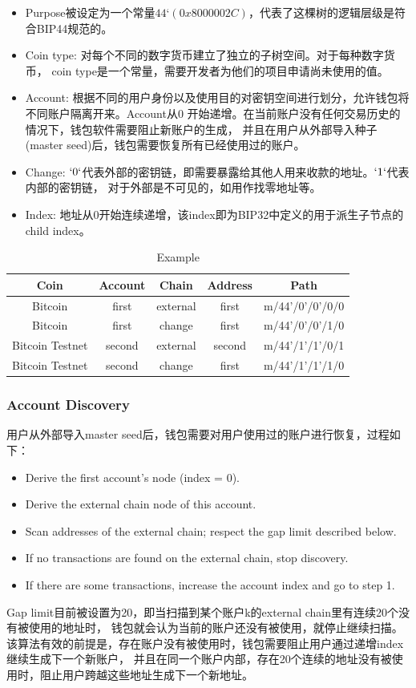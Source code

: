 \begin{itemize}
\item Purpose被设定为一个常量$44‘(0x8000002C)$，代表了这棵树的逻辑层级是符合BIP44规范的。
\item Coin type: 对每个不同的数字货币建立了独立的子树空间。对于每种数字货币，
coin type是一个常量，需要开发者为他们的项目申请尚未使用的值。
\item Account: 根据不同的用户身份以及使用目的对密钥空间进行划分，允许钱包将不同账户隔离开来。Account从0 开始递增。在当前账户没有任何交易历史的情况下，钱包软件需要阻止新账户的生成，
并且在用户从外部导入种子(master seed)后，钱包需要恢复所有已经使用过的账户。
\item Change: $`0`$代表外部的密钥链，即需要暴露给其他人用来收款的地址。$`1`$代表内部的密钥链，
对于外部是不可见的，如用作找零地址等。
\item Index: 地址从0开始连续递增，该index即为BIP32中定义的用于派生子节点的child index。
\end{itemize}

\begin{table}
\centering
\caption{Example}
\begin{tabular}{|c|c|c|c|c|}
\hline
\small
Coin &  Account  &   Chain  &  Address &  Path \\\hline
Bitcoin &  first  &  external &  first &  m/44'/0'/0'/0/0 \\\hline
Bitcoin &  first  &  change &  first &  m/44'/0'/0'/1/0 \\\hline
Bitcoin Testnet &  second  &  external &  second &  m/44'/1'/1'/0/1\\\hline
Bitcoin Testnet &  second  &  change &  first &  m/44'/1'/1'/1/0\\\hline
\end{tabular}
\end{table}

\subsubsection{Account Discovery}
用户从外部导入master seed后，钱包需要对用户使用过的账户进行恢复，过程如下：
\begin{itemize}
\item Derive the first account's node (index = 0).
\item Derive the external chain node of this account.
\item Scan addresses of the external chain; respect the gap limit described below.
\item If no transactions are found on the external chain, stop discovery.
\item If there are some transactions, increase the account index and go to step 1.
\end{itemize}
 Gap limit目前被设置为20，即当扫描到某个账户k的external chain里有连续20个没有被使用的地址时，
 钱包就会认为当前的账户还没有被使用，就停止继续扫描。
该算法有效的前提是，存在账户没有被使用时，钱包需要阻止用户通过递增index继续生成下一个新账户，
并且在同一个账户内部，存在20个连续的地址没有被使用时，阻止用户跨越这些地址生成下一个新地址。


